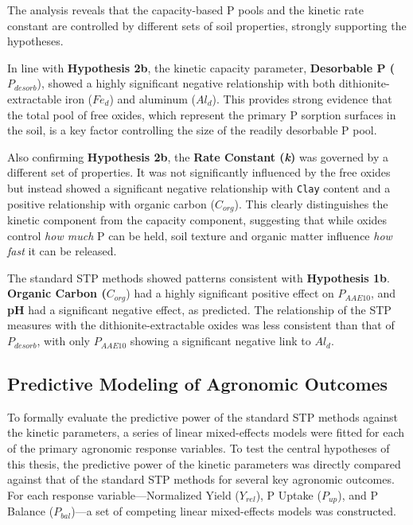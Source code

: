 \documentclass[
  a4paper,
]{article}
\begin{document}
The analysis reveals that the capacity-based P pools and the kinetic
rate constant are controlled by different sets of soil properties,
strongly supporting the hypotheses.

In line with \textbf{Hypothesis 2b}, the kinetic capacity parameter,
\textbf{Desorbable P (}\(P_{desorb}\)), showed a highly significant
negative relationship with both dithionite-extractable iron (\(Fe_d\))
and aluminum (\(Al_d\)). This provides strong evidence that the total
pool of free oxides, which represent the primary P sorption surfaces in
the soil, is a key factor controlling the size of the readily desorbable
P pool.

Also confirming \textbf{Hypothesis 2b}, the \textbf{Rate Constant
(\emph{k})} was governed by a different set of properties. It was not
significantly influenced by the free oxides but instead showed a
significant negative relationship with \texttt{Clay} content and a
positive relationship with organic carbon (\(C_{org}\)). This clearly
distinguishes the kinetic component from the capacity component,
suggesting that while oxides control \emph{how much} P can be held, soil
texture and organic matter influence \emph{how fast} it can be released.

The standard STP methods showed patterns consistent with
\textbf{Hypothesis 1b}. \textbf{Organic Carbon (}\(C_{org}\)) had a
highly significant positive effect on \(P_{AAE10}\), and \textbf{pH} had
a significant negative effect, as predicted. The relationship of the STP
measures with the dithionite-extractable oxides was less consistent than
that of \(P_{desorb}\), with only \(P_{AAE10}\) showing a significant
negative link to \(Al_d\).

\subsection{Predictive Modeling of Agronomic
Outcomes}\label{sec-agronomic-modeling}

To formally evaluate the predictive power of the standard STP methods
against the kinetic parameters, a series of linear mixed-effects models
were fitted for each of the primary agronomic response variables. To
test the central hypotheses of this thesis, the predictive power of the
kinetic parameters was directly compared against that of the standard
STP methods for several key agronomic outcomes. For each response
variable---Normalized Yield (\(Y_{rel}\)), P Uptake (\(P_{up}\)), and P
Balance (\(P_{bal}\))---a set of competing linear mixed-effects models
was constructed.
\end{document}
